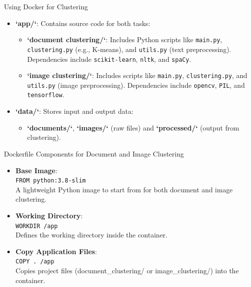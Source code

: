 \documentclass[notes]{beamer}
\begin{document}
{\begin{frame}[fragile]{Using Docker for Clustering }
 \begin{itemize}
        \item \textbf{`app/`}: Contains source code for both tasks:
        \begin{itemize}
            \item \textbf{`document clustering/`}: Includes Python scripts like \texttt{main.py}, \texttt{clustering.py} (e.g., K-means), and \texttt{utils.py} (text preprocessing). Dependencies include \texttt{scikit-learn}, \texttt{nltk}, and \texttt{spaCy}.
            \item \textbf{`image clustering/`}: Includes scripts like \texttt{main.py}, \texttt{clustering.py}, and \texttt{utils.py} (image preprocessing). Dependencies include \texttt{opencv}, \texttt{PIL}, and \texttt{tensorflow}.
        \end{itemize}
        
        \item \textbf{`data/`}: Stores input and output data:
        \begin{itemize}
            \item \textbf{`documents/`}, \textbf{`images/`} (raw files) and \textbf{`processed/`} (output from clustering).
        \end{itemize}
    \end{itemize}  
\end{frame}

\begin{frame}{Dockerfile Components for Document and Image Clustering}
    \begin{itemize}
        \item \textbf{Base Image}: \\
        \texttt{FROM python:3.8-slim} \\
        A lightweight Python image to start from for both document and image clustering.
        
        \item \textbf{Working Directory}: \\
        \texttt{WORKDIR /app} \\
        Defines the working directory inside the container.
        
        \item \textbf{Copy Application Files}: \\
        \texttt{COPY . /app} \\
        Copies project files (document\_clustering/ or image\_clustering/) into the container.
        

\end{itemize}
\end{frame}}
\end{document}
